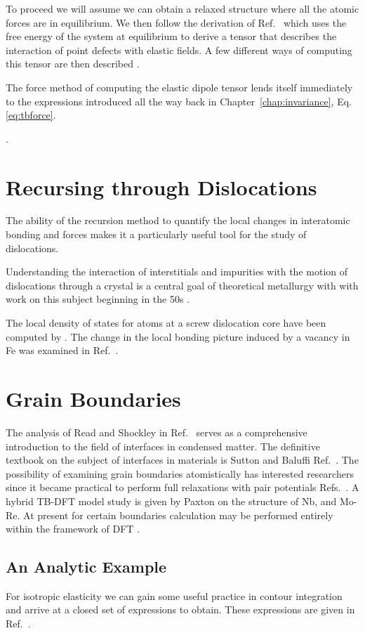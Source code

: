 To proceed we will assume we can obtain a relaxed structure where all the atomic forces are
in equilibrium. We then follow the derivation of Ref.~\cite{freedman09} which uses the free energy
of the system at equilibrium to derive a tensor that describes the interaction of point defects 
with elastic fields. A few different ways of computing this tensor are then described \cite{nazarov16}.

The force method of computing the elastic dipole tensor lends itself 
immediately to the expressions introduced all the way back in 
Chapter~\ref{chap:invariance}, Eq.\ref{eq:tbforce}.

\cite{paxton90}.

\section{Recursing through Dislocations}
The ability of the recursion method to quantify the local changes in interatomic bonding and
forces makes it a particularly useful tool for the study of dislocations. 

Understanding the interaction of interstitials and impurities with the motion of
dislocations through a crystal is a central goal of theoretical metallurgy with
with work on this subject beginning in the 50s \cite{cochardt55}.

The local density of states for atoms at a screw dislocation core have been computed by \cite{paidar81}. 
The change in the local bonding picture induced by a vacancy in Fe was examined in Ref.~\cite{ohta87}.

\section{Grain Boundaries}
The analysis of Read and Shockley in Ref.~\cite{read50} serves as a comprehensive
introduction to the field of interfaces in condensed matter. The definitive textbook
on the subject of interfaces in materials is Sutton and Baluffi Ref.~\cite{sutton95}.
The possibility of examining grain boundaries atomistically has interested
researchers since it became practical to perform full relaxations with pair
potentials Refs.~\cite{bristowe75,wolf83, rittner96, tschopp07}.
A hybrid TB-DFT model study is given by Paxton \cite{paxton96} on the structure of Nb, and Mo-Re.
At present for certain boundaries calculation may be performed entirely within
the framework of DFT \cite{momida13, du11, du12, mceniry18}.

\subsection{An Analytic Example}
For isotropic elasticity we can gain some useful practice in contour integration and arrive
at a closed set of expressions to obtain. These expressions are given in Ref.~\cite{sutton95}.

